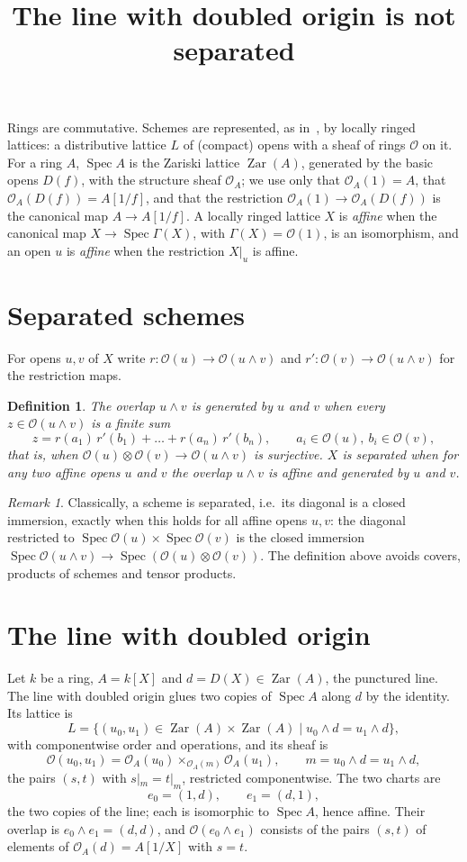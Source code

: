 \documentclass[11pt]{article}
\title{The line with doubled origin is not separated}
\author{}
\date{}
\newtheorem{definition}{Definition}
\theoremstyle{remark}
\newtheorem{remark}{Remark}
\newcommand{\Zar}{\operatorname{Zar}}
\newcommand{\Spec}{\operatorname{Spec}}
\newcommand{\cO}{\mathcal{O}}
\begin{document}
\maketitle

Rings are commutative. Schemes are represented, as in~\cite{CLS,Zeu}, by
locally ringed lattices: a distributive lattice $L$ of (compact) opens with
a sheaf of rings $\cO$ on it. For a ring $A$, $\Spec A$ is the Zariski
lattice $\Zar(A)$, generated by the basic opens $D(f)$, with the structure
sheaf $\cO_A$; we use only that $\cO_A(1)=A$, that
$\cO_A(D(f))=A[1/f]$, and that the restriction $\cO_A(1)\to\cO_A(D(f))$
is the canonical map $A\to A[1/f]$. A locally ringed lattice $X$ is
\emph{affine} when the canonical map $X\to\Spec\Gamma(X)$, with
$\Gamma(X)=\cO(1)$, is an isomorphism, and an open $u$ is \emph{affine}
when the restriction $X|_u$ is affine.

\section{Separated schemes}

For opens $u,v$ of $X$ write $r\colon\cO(u)\to\cO(u\wedge v)$ and
$r'\colon\cO(v)\to\cO(u\wedge v)$ for the restriction maps.

\begin{definition}
The overlap $u\wedge v$ is \emph{generated} by $u$ and $v$ when every
$z\in\cO(u\wedge v)$ is a finite sum
\[
  z=r(a_1)\,r'(b_1)+\dots+r(a_n)\,r'(b_n),\qquad a_i\in\cO(u),\ b_i\in\cO(v),
\]
that is, when $\cO(u)\otimes\cO(v)\to\cO(u\wedge v)$ is surjective. $X$
is \emph{separated} when for any two affine opens $u$ and $v$ the overlap
$u\wedge v$ is affine and generated by $u$ and $v$.
\end{definition}

\begin{remark}
Classically, a scheme is separated, i.e.\ its diagonal is a closed
immersion, exactly when this holds for all affine opens $u,v$: the
diagonal restricted to $\Spec\cO(u)\times\Spec\cO(v)$ is the closed
immersion $\Spec\cO(u\wedge v)\to\Spec(\cO(u)\otimes\cO(v))$. The
definition above avoids covers, products of schemes and tensor products.
\end{remark}

\section{The line with doubled origin}

Let $k$ be a ring, $A=k[X]$ and $d=D(X)\in\Zar(A)$, the punctured line.
The line with doubled origin glues two copies of $\Spec A$ along $d$ by
the identity. Its lattice is
\[
  L=\{(u_0,u_1)\in\Zar(A)\times\Zar(A)\mid u_0\wedge d=u_1\wedge d\},
\]
with componentwise order and operations, and its sheaf is
\[
  \cO(u_0,u_1)=\cO_A(u_0)\times_{\cO_A(m)}\cO_A(u_1),\qquad
  m=u_0\wedge d=u_1\wedge d,
\]
the pairs $(s,t)$ with $s|_m=t|_m$, restricted componentwise. The two
charts are
\[
  e_0=(1,d),\qquad e_1=(d,1),
\]
the two copies of the line; each is isomorphic to $\Spec A$, hence
affine. Their overlap is $e_0\wedge e_1=(d,d)$, and
$\cO(e_0\wedge e_1)$ consists of the pairs $(s,t)$ of elements of
$\cO_A(d)=A[1/X]$ with $s=t$.
\end{document}
